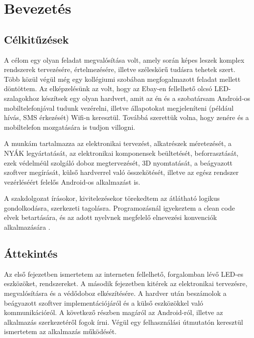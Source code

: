\documentclass[../main.tex]{subfiles}
\begin{document}
\section{Bevezetés}
    \subsection{Célkitűzések}
        A célom egy olyan feladat megvalósítása volt, amely során képes leszek komplex rendszerek tervezésére, értelmezésére, illetve széleskörű tudásra tehetek szert. Több közül végül még egy kollégiumi szobában megfogalmazott feladat mellett döntöttem. 
        Az elképzelésünk az volt, hogy az Ebay-en fellelhető olcsó LED-szalagokhoz készítsek egy olyan hardvert, amit az én és a szobatársam Android-os mobiltelefonjával tudunk vezérelni, illetve állapotokat megjeleníteni (például hívás, SMS érkezését) Wifi-n keresztül. Továbbá szerettük volna, hogy zenére és a mobiltelefon mozgatására is tudjon villogni. 
        
        A munkám tartalmazza az elektronikai tervezést, alkatrészek méretezését, a NYÁK legyártatását, az elektronikai komponensek beültetését, beforrasztását, ezek védelméül szolgáló doboz megtervezését, 3D nyomtatását, a beágyazott szoftver megírását, külső hardverrel való összekötését, illetve az egész rendszer vezérléséért felelős Android-os alkalmazást is.
        
        A szakdolgozat írásokor, kivitelezésekor törekedtem az átlátható logikus gondolkodásra, szerkezeti tagolásra. Programozásnál igyekeztem a clean code elvek betartására, és az adott nyelvnek megfelelő elnevezési konvenciók alkalmazására \cite{b_embedded_c_coding}\cite{b_programming_embedded_systems}\citet{android_clean_code}.
        
    \subsection{Áttekintés}
        Az első fejezetben ismertetem az interneten fellelhető, forgalomban lévő LED-es eszközöket, rendszereket.
        A második fejezetben kitérek az elektronikai tervezésre, megvalósításra és a védődoboz elkészítésére.
        A hardver után beszámolok a beágyazott szoftver implementációjáról és a külső eszközökkel való kommunikációról.
        A következő részben magáról az Android-ról, illetve az alkalmazás szerkezetéről fogok írni. Végül egy felhasználási útmutatón keresztül ismertetem az alkalmazás működését.
\end{document}
